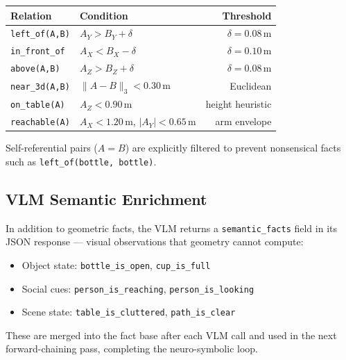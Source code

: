\begin{center}
\small
\begin{tabular}{llr}
\toprule
\textbf{Relation} & \textbf{Condition} & \textbf{Threshold} \\
\midrule
\texttt{left\_of(A,B)}   & $A_Y > B_Y + \delta$            & $\delta=0.08$\,m \\
\texttt{in\_front\_of}   & $A_X < B_X - \delta$            & $\delta=0.10$\,m \\
\texttt{above(A,B)}      & $A_Z > B_Z + \delta$            & $\delta=0.08$\,m \\
\texttt{near\_3d(A,B)}   & $\|A-B\|_3 < 0.30$\,m          & Euclidean \\
\texttt{on\_table(A)}    & $A_Z < 0.90$\,m                 & height heuristic \\
\texttt{reachable(A)}    & $A_X<1.20$\,m, $|A_Y|<0.65$\,m & arm envelope \\
\bottomrule
\end{tabular}
\end{center}

Self-referential pairs ($A = B$) are explicitly filtered to prevent
nonsensical facts such as \texttt{left\_of(bottle,\,bottle)}.

\subsection{VLM Semantic Enrichment}

In addition to geometric facts, the VLM returns a
\texttt{semantic\_facts} field in its JSON response — visual observations
that geometry cannot compute:
\begin{itemize}[noitemsep]
  \item Object state: \texttt{bottle\_is\_open}, \texttt{cup\_is\_full}
  \item Social cues: \texttt{person\_is\_reaching}, \texttt{person\_is\_looking}
  \item Scene state: \texttt{table\_is\_cluttered}, \texttt{path\_is\_clear}
\end{itemize}
These are merged into the fact base after each VLM call and used in the next
forward-chaining pass, completing the neuro-symbolic loop.
